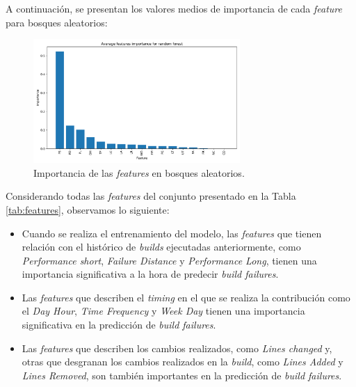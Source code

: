 \noindent A continuación, se presentan los valores medios de importancia de cada \textit{feature}
para bosques aleatorios:

\begin{figure}[H]
    \centering
    \includegraphics[width=0.7\textwidth]{images/Average features importance for random forest.pdf}
    \caption{Importancia de las \textit{features} en bosques aleatorios.}
    \label{fig:random_forest_feature_importance}
\end{figure}

\noindent Considerando todas las \textit{features} del conjunto presentado en la Tabla \ref{tab:features},
observamos lo siguiente:

\begin{itemize}
    \item Cuando se realiza el entrenamiento del modelo, las \textit{features} que tienen relación
    con el histórico de \textit{builds} ejecutadas anteriormente, como \textit{Performance short},
    \textit{Failure Distance} y \textit{Performance Long}, tienen una importancia significativa
    a la hora de predecir \textit{build failures}.\\

    \item Las \textit{features} que describen el \textit{timing} en el que se realiza la
    contribución como el \textit{Day Hour}, \textit{Time Frequency} y \textit{Week Day} tienen
    una importancia significativa en la predicción de \textit{build failures}.\\

    \item Las \textit{features} que describen los cambios realizados, como \textit{Lines changed}
    y, otras que desgranan los cambios realizados en la \textit{build}, como \textit{Lines Added}
    y \textit{Lines Removed}, son también importantes en la predicción de \textit{build failures}.
\end{itemize}

